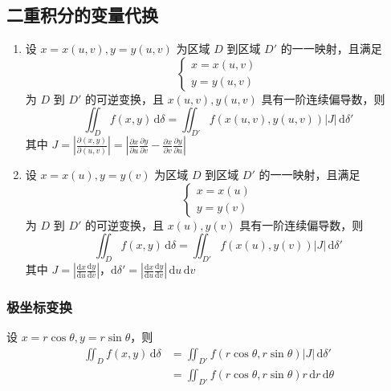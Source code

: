 \subsection{二重积分的变量代换}

\begin{enumerate}
    \item 设 $x=x(u,v),y=y(u,v)$ 为区域 $D$ 到区域 $D'$ 的一一映射，且满足
          \[
              \begin{cases}
                  x=x(u,v) \\
                  y=y(u,v)
              \end{cases}
          \]
          为 $D$ 到 $D'$ 的可逆变换，且 $x(u,v),y(u,v)$ 具有一阶连续偏导数，则
          \[
              \iint_{D} f(x,y) \, \mathrm{d}\delta = \iint_{D'} f(x(u,v),y(u,v)) \left| J \right| \, \mathrm{d}\delta'
          \]
          其中 $J = \left| \frac{\partial(x,y)}{\partial(u,v)} \right| = \left| \frac{\partial x}{\partial u} \frac{\partial y}{\partial v} - \frac{\partial x}{\partial v} \frac{\partial y}{\partial u} \right|$
    \item 设 $x=x(u),y=y(v)$ 为区域 $D$ 到区域 $D'$ 的一一映射，且满足
          \[
              \begin{cases}
                  x=x(u) \\
                  y=y(v)
              \end{cases}
          \]
          为 $D$ 到 $D'$ 的可逆变换，且 $x(u),y(v)$ 具有一阶连续偏导数，则
          \[
              \iint_{D} f(x,y) \, \mathrm{d}\delta = \iint_{D'} f(x(u),y(v)) \left| J \right| \, \mathrm{d}\delta'
          \]
          其中 $J = \left| \frac{\mathrm{d}x}{\mathrm{d}u} \frac{\mathrm{d}y}{\mathrm{d}v} \right|$，$\mathrm{d}\delta' = \left| \frac{\mathrm{d}x}{\mathrm{d}u} \frac{\mathrm{d}y}{\mathrm{d}v} \right| \, \mathrm{d}u \, \mathrm{d}v$
\end{enumerate}

\subsubsection{极坐标变换}

设 $x=r\cos\theta,y=r\sin\theta$，则
\[
    \begin{aligned}
        \iint_{D} f(x,y) \, \mathrm{d}\delta & = \iint_{D'} f(r\cos\theta,r\sin\theta) \left| J \right| \, \mathrm{d}\delta' \\
                                             & = \iint_{D'} f(r\cos\theta,r\sin\theta) r \, \mathrm{d}r \, \mathrm{d}\theta
    \end{aligned}
\]

